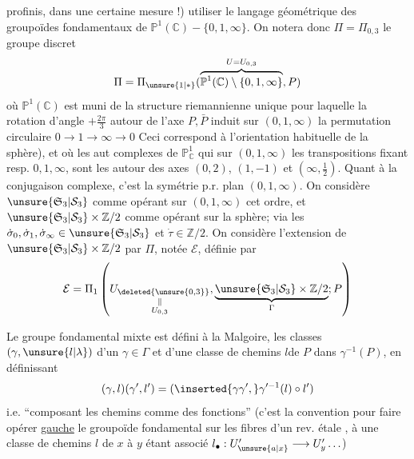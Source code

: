 profinis, dans une certaine mesure !) utiliser le langage géométrique des groupoïdes fondamentaux de $\mathbb P^1(\mathbb C)-\{0,1,\infty\}$. On  notera donc $\Pi=\Pi_{0,3}$ le groupe discret
\[
\Pi=\Pi_{\unsure{1|*}}(\overbrace{\mathbb P^1(\mathbb C)\setminus\{0,1,\infty\}}^{U=U_{0,3}},P)
\]
où $\mathbb P^1(\mathbb C)$ est muni de la structure  riemannienne  unique pour laquelle la rotation \inserted{$\dot\rho$} d'angle $+\frac{2\pi}{3}$ autour de l'axe $P,\bar P$  induit sur $(0,1,\infty)$ la permutation circulaire $0\longrightarrow1\longrightarrow\infty\longrightarrow0$ Ceci correspond à l'orientation habituelle de la sphère), et où les aut complexes  de $\mathbb P^1_{\mathbb C}$ qui     sur $(0,1,\infty)$ les transpositions fixant resp. $0,1,\infty$, sont  les   autour des axes  $(0,2)$, $(1,-1)$ et $(\infty,\frac12)$.
Quant à la conjugaison complexe, c'est la symétrie p.r.  plan $(0,1,\infty)$. On considère $\unsure{\mathfrak S_3|\mathcal S_3}$ comme opérant sur $(0,1,\infty)$  cet ordre, et $\unsure{\mathfrak S_3|\mathcal S_3}\times\mathbb Z/2$ comme opérant sur la sphère; via les $\dot\sigma_0,\dot\sigma_1,\dot\sigma_\infty\in\unsure{\mathfrak S_3|\mathcal S_3}$ et $\dot\tau\in\mathbb Z/2$. On considère l'extension  de $\unsure{\mathfrak S_3|\mathcal S_3}\times\mathbb Z/2$ par $\Pi$, notée  $\mathcal E$, définie par
\[
\mathcal E=\Pi_1\left(\underset{\substack{\Vert\\U_{0,3}}}{U_{\deleted{\unsure{0,3}}}},\underbrace{\unsure{\mathfrak S_3|\mathcal S_3}\times\mathbb Z/2}_{\Gamma};P\right)
\]

Le groupe fondamental mixte est défini à la Malgoire,  les classes $(\gamma,\unsure{l|\lambda})$ d'un $\gamma\in\Gamma$ et d'une classe de chemins $l$\unsure{/|)}de $P$ dans $\gamma^{-1}(P)$, en définissant
\[
(\gamma,l)(\gamma',l')=(\inserted{\gamma\gamma',}\gamma'^{-1}(l)\circ l')
\]
i.e. ``composant les chemins comme des fonctions'' (c'est la convention pour faire opérer \uline{ gauche} le groupoïde fondamental sur les fibres d'un rev. étale , à une classe de chemins $l$ de $x$ à $y$ étant associé $l_\bullet:U'_{\unsure{a|x}}\longrightarrow U'_y\ldots$)

